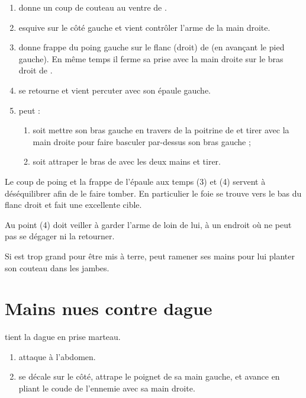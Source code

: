 \begin{technique}

\begin{enumerate}
	\item \A donne un coup de couteau au ventre de \D.
	
	\item \D esquive sur le côté gauche et vient contrôler l'arme de la main droite.
	
	\item \D donne frappe du poing gauche sur le flanc (droit) de \A (en avançant le pied gauche).
	En même temps il ferme sa prise avec la main droite sur le bras droit de \A.
	
	\item \D se retourne et vient percuter \A avec son épaule gauche.
	
	\item \D peut :
	\begin{enumerate}
		\item soit mettre son bras gauche en travers de la poitrine de \A et tirer avec la main droite pour faire basculer \A par-dessus son bras gauche ;
		
		\item soit attraper le bras de \A avec les deux mains et tirer.
	\end{enumerate}
\end{enumerate}

Le coup de poing et la frappe de l'épaule aux temps (3) et (4) servent à déséquilibrer \A afin de le faire tomber.
En particulier le foie se trouve vers le bas du flanc droit et fait une excellente cible.

Au point (4) \D doit veiller à garder l'arme de \A loin de lui, à un endroit où \A ne peut pas se dégager ni la retourner.

Si \A est trop grand pour être mis à terre, \D peut ramener ses mains pour lui planter son couteau dans les jambes.

\end{technique}


\section{Mains nues contre dague}


\begin{exercice}

\A tient la dague en prise marteau.

\begin{enumerate}
	\item \A attaque à l'abdomen.
	
	\item \D se décale sur le côté, attrape le poignet de sa main gauche, et avance en pliant le coude de l'ennemie avec sa main droite.
\end{enumerate}
\end{exercice}


